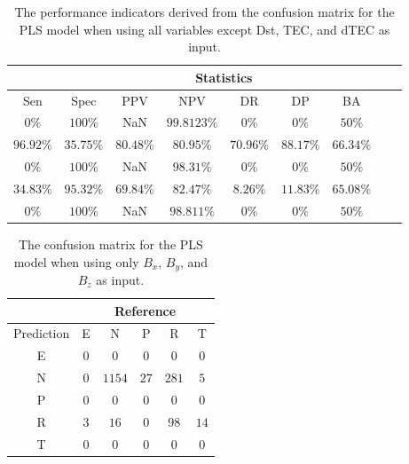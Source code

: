 \begin{table}[!ht]
	\centering
	\begin{tabular}{|c|c|c|c|c|c|c|c|c|}
		\hline
		 & \multicolumn{7}{c|}{Statistics} \\ \hline
		Sen & Spec & PPV & NPV & DR & DP & BA \\ \hline
		$0\%$ & $100\%$ & NaN & $99.8123\%$ & $0\%$ & $0\%$ & $50\%$ \\ \hline
		$96.92\%$ & $35.75\%$ & $80.48\%$ & $80.95\%$ & $70.96\%$ & $88.17\%$ & $66.34\%$ \\ \hline
		$0\%$ & $100\%$ & NaN & $98.31\%$ & $0\%$ & $0\%$ & $50\%$ \\ \hline
		$34.83\%$ & $95.32\%$ & $69.84\%$ & $82.47\%$ & $8.26\%$ & $11.83\%$ & $65.08\%$ \\ \hline
		$0\%$ & $100\%$ & NaN & $98.811\%$ & $0\%$ & $0\%$ & $50\%$ \\ \hline
	\end{tabular}
	\caption{The performance indicators derived from the confusion matrix for the PLS model when using all variables except Dst, TEC, and dTEC as input.}
	\label{tab:cs:noTEC:pls}
\end{table}

\begin{table}[!ht]
	\centering
	\begin{tabular}{|c|c|c|c|c|c|}
		\hline
		 & \multicolumn{5}{|c|}{Reference} \\ \hline
		 Prediction & E & N & P & R & T \\ \hline
		 E & $0$ & $0$ & $0$ & $0$ & $0$ \\ \hline
		 N & $0$ & $1154$ & $27$ & $281$ & $5$ \\ \hline
		 P & $0$ & $0$ & $0$ & $0$ & $0$ \\ \hline
		 R & $3$ & $16$ & $0$ & $98$ & $14$ \\ \hline
		 T & $0$ & $0$ & $0$ & $0$ & $0$ \\ \hline
	\end{tabular}
	\caption{The confusion matrix for the PLS model when using only $B_{x}$, $B_{y}$, and $B_{z}$ as input.}
	\label{tab:cm:coord:pls}
\end{table}

